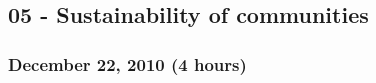 \documentclass[a4paper]{article}
\begin{document}

    


\subsection{05 - Sustainability of communities}


\subsubsection{December 22, 2010 (4 hours)}
\end{document}
